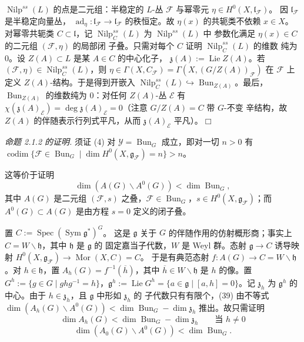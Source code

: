 $\operatorname{Nilp}^{ss}(L)$ 的点是二元组：半稳定的 $L$-丛
$\mathcal{F}$ 与幂零元 $\eta\in H^0(X,\mathfrak{l}_{\mathcal{F}})$。
因 $\mathfrak{l}_{\mathcal{F}}$ 是半稳定向量丛，
$\operatorname{ad}_\eta:\mathfrak{l}_{\mathcal{F}}\to
\mathfrak{l}_{\mathcal{F}}$ 的秩恒定。故 $\eta(x)$ 的共轭类不依赖
$x\in X$。对幂零共轭类 $C\subset\mathfrak{l}$，记
$\operatorname{Nilp}_C^{ss}(L)$ 为 $\operatorname{Nilp}^{ss}(L)$ 中
参数化满足 $\eta(x)\in C$ 的二元组 $(\mathcal{F},\eta)$ 的局部闭
子叠。只需对每个 $C$ 证明 $\operatorname{Nilp}_C^{ss}(L)$ 的维数
纯为 $0$。设 $Z(A)\subset L$ 是某 $A\in C$ 的中心化子，
$\mathfrak{z}(A):=\operatorname{Lie}Z(A)$。若
$(\mathcal{F},\eta)\in\operatorname{Nilp}_C^{ss}(L)$，则
$\eta\in\Gamma(X,C_{\mathcal{F}})
=\Gamma(X,(G/Z(A))_{\mathcal{F}})$ 在 $\mathcal{F}$ 上定义
$Z(A)$-结构。于是得到开嵌入
$\operatorname{Nilp}_C^{ss}(L)
\hookrightarrow\operatorname{Bun}_{Z(A)}$。最后，
$\operatorname{Bun}_{Z(A)}$ 的维数纯为 $0$：对任何 $Z(A)$-丛
$\mathcal{E}$ 有 $\chi(\mathfrak{z}(A)_{\mathcal{E}})
=\deg\mathfrak{z}(A)_{\mathcal{E}}=0$（注意 $G/Z(A)=C$ 带 $G$-不变
辛结构，故 $Z(A)$ 的伴随表示行列式平凡，从而
$\mathfrak{z}(A)_{\mathcal{E}}$ 平凡）。\hfill$\Box$

 \emph{命题 2.1.2 的证明.} 须证 (4) 对
$\mathcal{Y}=\operatorname{Bun}_G$ 成立，即对一切 $n>0$ 有
$\operatorname{codim}\{\mathcal{F}\in\operatorname{Bun}_G\mid
\dim H^0(X,\mathfrak{g}_{\mathcal{F}})=n\}>n$。


这等价于证明
\begin{equation}\tag{39}
  \dim(A(G)\backslash A^{0}(G))<\dim\operatorname{Bun}_G,
\end{equation}
其中 $A(G)$ 是二元组 $(\mathcal{F},s)$ 之叠，$\mathcal{F}\in
\operatorname{Bun}_G$，$s\in H^0(X,\mathfrak{g}_{\mathcal{F}})$；而
$A^{0}(G)\subset A(G)$ 是由方程 $s=0$ 定义的闭子叠。

置 $C:=\operatorname{Spec}(\operatorname{Sym}\mathfrak{g}^{*})^{G}$。
这是 $\mathfrak{g}$ 关于 $G$ 的伴随作用的仿射概形商；事实上
$C=W\backslash\mathfrak{h}$，其中 $\mathfrak{h}$ 是 $\mathfrak{g}$ 的
固定嘉当子代数，$W$ 是 Weyl 群。态射 $\mathfrak{g}\to C$ 诱导映射
$H^0(X,\mathfrak{g}_{\mathcal{F}})\to\operatorname{Mor}(X,C)=C$。
于是有典范态射 $f:A(G)\to C=W\backslash\mathfrak{h}$。对
$h\in\mathfrak{h}$，置 $A_h(G)=f^{-1}(\overline{h})$，其中
$\overline{h}\in W\backslash\mathfrak{h}$ 是 $h$ 的像。置
$G^{h}:=\{g\in G\mid ghg^{-1}=h\}$，$\mathfrak{g}^{h}:=
\operatorname{Lie}G^{h}=\{a\in\mathfrak{g}\mid[a,h]=0\}$。记
$\mathfrak{z}_h$ 为 $\mathfrak{g}^{h}$ 的中心。由于
$h\in\mathfrak{z}_h$，且 $\mathfrak{g}$ 中形如 $\mathfrak{z}_h$ 的
子代数只有有限个，(39) 由不等式
$\dim(A_h(G)\backslash A^{0}(G))
<\dim\operatorname{Bun}_G-\dim\mathfrak{z}_h$ 推出。故只需证明
\begin{equation}\tag{40}
  \dim A_h(G)<\dim\operatorname{Bun}_G-\dim\mathfrak{z}_h
  \qquad\text{当 } h\ne 0
\end{equation}
\begin{equation}\tag{41}
  \dim(A_0(G)\backslash A^{0}(G))<\dim\operatorname{Bun}_G.
\end{equation}

